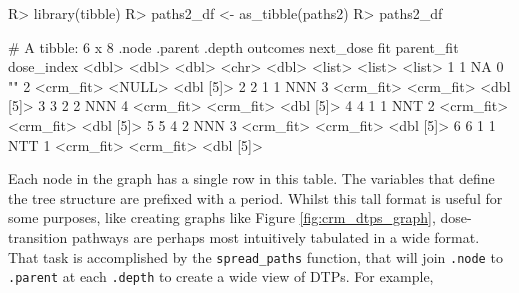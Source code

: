 \documentclass[article]{jss}
\begin{document}
\begin{CodeChunk}

\begin{CodeInput}
R> library(tibble)
R> paths2_df <- as_tibble(paths2) 
R> paths2_df %
\end{CodeInput}

\begin{CodeOutput}
# A tibble: 6 x 8
  .node .parent .depth outcomes next_dose fit       parent_fit dose_index
  <dbl>   <dbl>  <dbl> <chr>        <dbl> <list>    <list>     <list>    
1     1      NA      0 ""               2 <crm_fit> <NULL>     <dbl [5]> 
2     2       1      1 NNN              3 <crm_fit> <crm_fit>  <dbl [5]> 
3     3       2      2 NNN              4 <crm_fit> <crm_fit>  <dbl [5]> 
4     4       1      1 NNT              2 <crm_fit> <crm_fit>  <dbl [5]> 
5     5       4      2 NNN              3 <crm_fit> <crm_fit>  <dbl [5]> 
6     6       1      1 NTT              1 <crm_fit> <crm_fit>  <dbl [5]> 
\end{CodeOutput}
\end{CodeChunk}

Each node in the graph has a single row in this table. The variables
that define the tree structure are prefixed with a period. Whilst this
tall format is useful for some purposes, like creating graphs like
Figure \ref{fig:crm_dtps_graph}, dose-transition pathways are perhaps
most intuitively tabulated in a wide format. That task is accomplished
by the \texttt{spread\_paths} function, that will join \texttt{.node} to
\texttt{.parent} at each \texttt{.depth} to create a wide view of DTPs.
For example,
\end{document}
